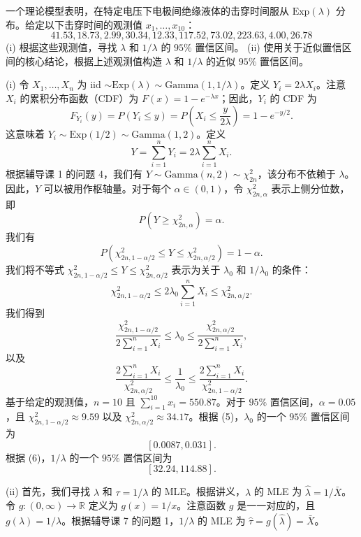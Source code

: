 \begin{questions}
\question 一个理论模型表明，在特定电压下电极间绝缘液体的击穿时间服从 $\text{Exp}(\lambda)$ 分布。给定以下击穿时间的观测值 $x_1, \dots, x_{10}$：
\[
41.53, 18.73, 2.99, 30.34, 12.33, 117.52, 73.02, 223.63, 4.00, 26.78
\]
(i) 根据这些观测值，寻找 $\lambda$ 和 $1/\lambda$ 的 $95\%$ 置信区间。
(ii) 使用关于近似置信区间的核心结论，根据上述观测值构造 $\lambda$ 和 $1/\lambda$ 的近似 $95\%$ 置信区间。

\begin{solution}
(i) 令 $X_1, \dots, X_n$ 为 iid $\sim \text{Exp}(\lambda) \sim \text{Gamma}(1, 1/\lambda)$。定义 $Y_i = 2\lambda X_i$。注意 $X_i$ 的累积分布函数（CDF）为 $F(x) = 1 - e^{-\lambda x}$；因此，$Y_i$ 的 CDF 为
\[
F_{Y_i}(y) = P(Y_i \le y) = P\left(X_i \le \frac{y}{2\lambda}\right) = 1 - e^{-y/2}.
\]
这意味着 $Y_i \sim \text{Exp}(1/2) \sim \text{Gamma}(1, 2)$。定义
\[
Y = \sum_{i=1}^n Y_i = 2\lambda \sum_{i=1}^n X_i.
\]
根据辅导课 1 的问题 4，我们有 $Y \sim \text{Gamma}(n, 2) \sim \chi_{2n}^2$，该分布不依赖于 $\lambda$。因此，$Y$ 可以被用作枢轴量。对于每个 $\alpha \in (0, 1)$，令 $\chi_{2n, \alpha}^2$ 表示上侧分位数，即
\[
P(Y \ge \chi_{2n, \alpha}^2) = \alpha.
\]
我们有
\[
P(\chi_{2n, 1-\alpha/2}^2 \le Y \le \chi_{2n, \alpha/2}^2) = 1 - \alpha.
\]
我们将不等式 $\chi_{2n, 1-\alpha/2}^2 \le Y \le \chi_{2n, \alpha/2}^2$ 表示为关于 $\lambda_0$ 和 $1/\lambda_0$ 的条件：
\[
\chi_{2n, 1-\alpha/2}^2 \le 2\lambda_0 \sum_{i=1}^n X_i \le \chi_{2n, \alpha/2}^2.
\]
我们得到
\[
\frac{\chi_{2n, 1-\alpha/2}^2}{2 \sum_{i=1}^n X_i} \le \lambda_0 \le \frac{\chi_{2n, \alpha/2}^2}{2 \sum_{i=1}^n X_i}, \tag{5}
\]
以及
\[
\frac{2 \sum_{i=1}^n X_i}{\chi_{2n, \alpha/2}^2} \le \frac{1}{\lambda_0} \le \frac{2 \sum_{i=1}^n X_i}{\chi_{2n, 1-\alpha/2}^2}. \tag{6}
\]
基于给定的观测值，$n = 10$ 且 $\sum_{i=1}^{10} x_i = 550.87$。对于 $95\%$ 置信区间，$\alpha = 0.05$，且 $\chi_{2n, 1-\alpha/2}^2 \approx 9.59$ 以及 $\chi_{2n, \alpha/2}^2 \approx 34.17$。根据 (5)，$\lambda_0$ 的一个 $95\%$ 置信区间为
\[
[0.0087, 0.031].
\]
根据 (6)，$1/\lambda$ 的一个 $95\%$ 置信区间为
\[
[32.24, 114.88].
\]
\end{solution}

\begin{solution}
(ii) 首先，我们寻找 $\lambda$ 和 $\tau = 1/\lambda$ 的 MLE。根据讲义，$\lambda$ 的 MLE 为 $\hat{\lambda} = 1/\bar{X}$。令 $g : (0, \infty) \to \mathbb{R}$ 定义为 $g(x) = 1/x$。注意函数 $g$ 是一一对应的，且 $g(\lambda) = 1/\lambda$。根据辅导课 7 的问题 1，$1/\lambda$ 的 MLE 为 $\hat{\tau} = g(\hat{\lambda}) = \bar{X}$。


\end{solution}
\end{questions}
